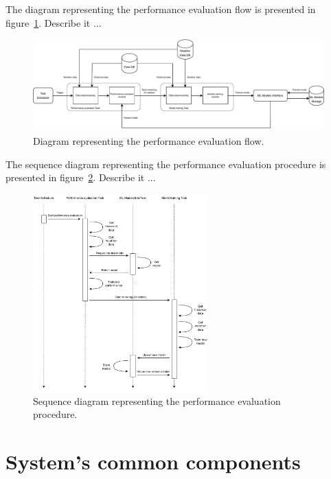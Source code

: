 The diagram representing the performance evaluation flow is presented in figure~\ref{fig:schedulerflow}.
Describe it ...

\begin{figure}[H]
\centering
\includegraphics[width=1\textwidth]{images/architecture_scheduler_flow}
\caption{Diagram representing the performance evaluation flow.}
\label{fig:schedulerflow}
\end{figure}

The sequence diagram representing the performance evaluation procedure is presented in figure~\ref{fig:schedulersequence}.
Describe it ...

\begin{figure}[H]
\centering
\includegraphics[width=0.6\textwidth]{images/architecture_scheduler_sequence}
\caption{Sequence diagram representing the performance evaluation procedure.}
\label{fig:schedulersequence}
\end{figure}


\section{System's common components}
\label{sec:components}
\vspace{0.2 cm}

